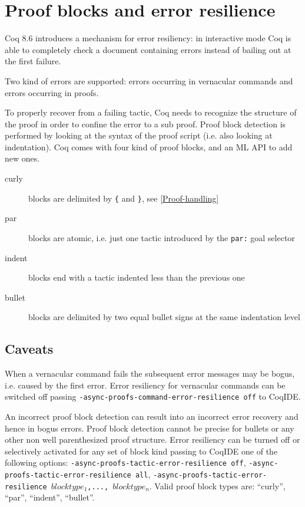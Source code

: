\section{Proof blocks and error resilience}

Coq 8.6 introduces a mechanism for error resiliency: in interactive mode Coq
is able to completely check a document containing errors instead of bailing
out at the first failure.

Two kind of errors are supported: errors occurring in vernacular commands and
errors occurring in proofs.

To properly recover from a failing tactic, Coq needs to recognize the structure of
the proof in order to confine the error to a sub proof.  Proof block detection
is performed by looking at the syntax of the proof script (i.e. also looking at indentation).
Coq comes with four kind of proof blocks, and an ML API to add new ones.

\begin{description}
\item[curly] blocks are delimited by \texttt{\{} and \texttt{\}}, see \ref{Proof-handling}
\item[par] blocks are atomic, i.e. just one tactic introduced by the \texttt{par:} goal selector
\item[indent] blocks end with a tactic indented less than the previous one
\item[bullet] blocks are delimited by two equal bullet signs at the same indentation level
\end{description}

\subsection{Caveats}

When a vernacular command fails the subsequent error messages may be bogus, i.e. caused by
the first error.  Error resiliency for vernacular commands can be switched off passing
\texttt{-async-proofs-command-error-resilience off} to CoqIDE.

An incorrect proof block detection can result into an incorrect error recovery and
hence in bogus errors.  Proof block detection cannot be precise for bullets or
any other non well parenthesized proof structure.  Error resiliency can be
turned off or selectively activated for any set of block kind passing to
CoqIDE one of the following options:
\texttt{-async-proofs-tactic-error-resilience off},
\texttt{-async-proofs-tactic-error-resilience all},
\texttt{-async-proofs-tactic-error-resilience $blocktype_1$,..., $blocktype_n$}.
Valid proof block types are: ``curly'', ``par'', ``indent'', ``bullet''. 


